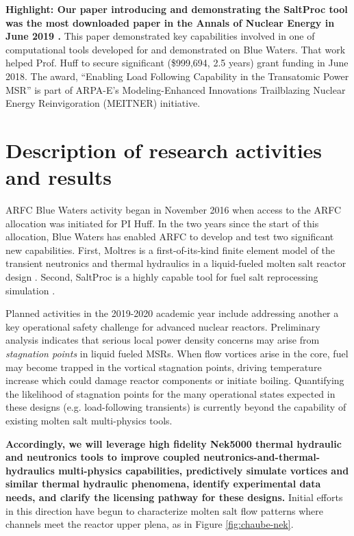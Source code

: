 \documentclass[letterpaper]{article}
\begin{document}
\textbf{Highlight: Our paper introducing and demonstrating the SaltProc tool was 
the most downloaded paper in the Annals of Nuclear Energy in June 2019 
\cite{rykhlevskii_modeling_2019}.} This 
paper demonstrated key capabilities involved in 
one of computational tools developed for and demonstrated on Blue Waters. That 
work helped Prof. Huff to secure significant (\$999,694, 2.5 years) grant 
funding in June 2018. The award, ``Enabling Load Following Capability in the 
Transatomic Power MSR'' is part of ARPA-E's Modeling-Enhanced Innovations 
Trailblazing Nuclear Energy Reinvigoration (MEITNER) initiative. 

\section{Description of research activities and results}

ARFC Blue Waters activity began in November 2016 when access to the ARFC 
allocation was initiated for PI Huff. In the two years since the start of 
this allocation, Blue Waters has enabled ARFC to develop and test two 
significant new capabilities. First, Moltres is a first-of-its-kind finite 
element model of the transient neutronics and thermal hydraulics in a 
liquid-fueled molten salt reactor design 
\cite{lindsay_introduction_2018,lindsay_moltres:_2018,ridley_introduction_2017,ridley_multiphysics_2017}.
Second, SaltProc is a highly capable tool for fuel salt reprocessing 
simulation 
\cite{rykhlevskii_full-core_2017,rykhlevskii_arfc/saltproc:_2018,rykhlevskii_advanced_2018}.

Planned activities in the 2019-2020 academic year include addressing another 
a key operational
safety challenge for advanced nuclear reactors. Preliminary analysis indicates that
serious local power density concerns may arise from \emph{stagnation points} in
liquid fueled MSRs.  When flow vortices arise in the core, fuel may become
trapped in the vortical stagnation points, driving
temperature increase which could damage reactor components or initiate
boiling.
Quantifying the likelihood of stagnation points for the many operational states
expected in these designs (e.g.  load-following transients) is currently beyond the
capability of existing molten salt multi-physics tools.

\textbf{Accordingly, we will leverage high fidelity Nek5000 thermal hydraulic and
neutronics tools to improve coupled neutronics-and-thermal-hydraulics
multi-physics capabilities, predictively simulate vortices and similar thermal
hydraulic phenomena, identify experimental data needs, and clarify the
licensing pathway for these designs.} Initial efforts in this direction have 
begun to characterize molten salt flow patterns where channels meet the reactor 
upper plena, as in Figure \ref{fig:chaube-nek}. 
\end{document}

